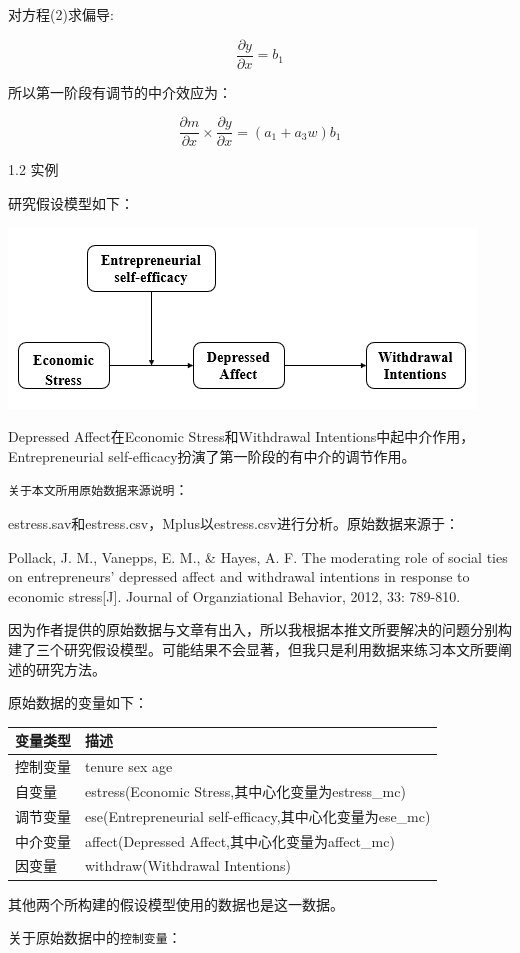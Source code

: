 \documentclass[
]{book}
\begin{document}
对方程(2)求偏导:

\[
\frac{\partial y}{\partial x}=b_{1}
\]

所以第一阶段有调节的中介效应为：

\[
\frac{\partial m}{\partial x} {\times} \frac{\partial y}{\partial x}=(a_{1}+a_{3}w)b_{1}
\]

1.2 实例

研究假设模型如下：

\includegraphics{figs/1142.png}

Depressed Affect在Economic Stress和Withdrawal
Intentions中起中介作用，Entrepreneurial self-efficacy扮演了第一阶段的有中介的调节作用。

\texttt{关于本文所用原始数据来源说明}：

estress.sav和estress.csv，Mplus以estress.csv进行分析。原始数据来源于：

Pollack, J. M., Vanepps, E. M., \& Hayes, A. F. The moderating role of social ties on entrepreneurs' depressed affect and withdrawal intentions in response to economic stress{[}J{]}. Journal of Organziational Behavior, 2012, 33: 789-810.

因为作者提供的原始数据与文章有出入，所以我根据本推文所要解决的问题分别构建了三个研究假设模型。可能结果不会显著，但我只是利用数据来练习本文所要阐述的研究方法。

原始数据的变量如下：

\begin{longtable}[]{@{}ll@{}}
\toprule
变量类型 & 描述\tabularnewline
\midrule
\endhead
控制变量 & tenure sex age\tabularnewline
自变量 & estress(Economic Stress,其中心化变量为estress\_mc)\tabularnewline
调节变量 & ese(Entrepreneurial self-efficacy,其中心化变量为ese\_mc)\tabularnewline
中介变量 & affect(Depressed Affect,其中心化变量为affect\_mc)\tabularnewline
因变量 & withdraw(Withdrawal Intentions)\tabularnewline
\bottomrule
\end{longtable}

其他两个所构建的假设模型使用的数据也是这一数据。

关于原始数据中的\texttt{控制变量}：
\end{document}
